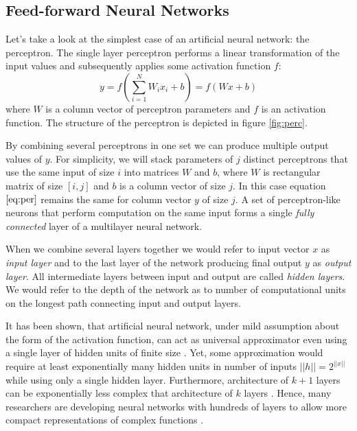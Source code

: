 \subsection{Feed-forward Neural Networks}
\label{ch:ffnn}

Let's take a look at the simplest case of an artificial neural network: the perceptron.
The single layer perceptron performs a linear transformation of the input values and subsequently applies some activation function $f$:
\begin{equation}\label{eq:per}
  y = f(\sum_{i=1}^N W_ix_i + b) = f(Wx+b)
\end{equation}
where $W$ is a column vector of perceptron parameters and $f$ is an activation function. The structure of the perceptron is depicted in figure \ref{fig:perc}.



By combining several perceptrons in one set we can produce multiple output values of $y$.
For simplicity, we will stack parameters of $j$ distinct perceptrons that use the same input of size $i$ into matrices $W$ and $b$, where $W$ is rectangular matrix of size $[i,j]$ and $b$ is a column vector of size $j$.
In this case equation $\ref{eq:per}$ remains the same for column vector $y$ of size $j$. A set of perceptron-like neurons that perform computation on the same input forms a single \textit{fully connected} layer of a multilayer neural network.

When we combine several layers together we would refer to input vector $x$ as \textit{input layer} and to the last layer of the network producing final output $y$ as \textit{output layer}. All intermediate layers between input and output are called \textit{hidden layers}. We would refer to the depth of the network as to number of computational units on the longest path connecting input and output layers.

It has been shown, that artificial neural network, under mild assumption about the form of the activation function, can act as universal approximator even using a single layer of hidden units of finite size \cite{Debao1993}. Yet, some approximation would require at least exponentially many hidden units in number of inputs $||h||=2^{||x||}$ \cite{Pascanu2014} while using only a single hidden layer. Furthermore, architecture of $k+1$ layers can be exponentially less complex that architecture of $k$ layers \cite{Bengio2009a}.
Hence, many researchers are developing neural networks with hundreds of layers to allow more compact representations of complex functions \cite{He2015, Srivastava2015}.

